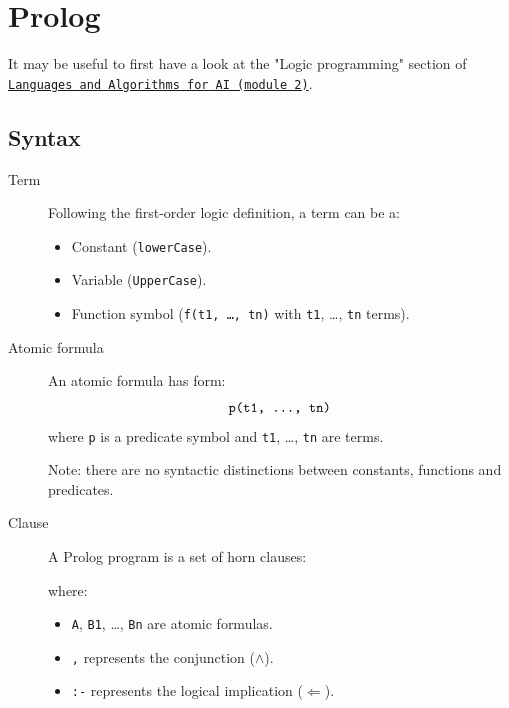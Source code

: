 \chapter{Prolog}


It may be useful to first have a look at the "Logic programming" section of 
\href{\gitLAAITwo}{\texttt{Languages and Algorithms for AI (module 2)}}.


\section{Syntax}

\begin{description}
    \item[Term] 
        Following the first-order logic definition, a term can be a:
        \begin{itemize}
            \item Constant (\texttt{lowerCase}).
            \item Variable (\texttt{UpperCase}).
            \item Function symbol (\texttt{f(t1, \dots, tn)} with \texttt{t1}, \dots, \texttt{tn} terms).
        \end{itemize}

    \item[Atomic formula] 
        An atomic formula has form:
        \[ \texttt{p(t1, \dots, tn)} \]
        where \texttt{p} is a predicate symbol and \texttt{t1}, \dots, \texttt{tn} are terms.

        Note: there are no syntactic distinctions between constants, functions and predicates.

    \item[Clause] 
        A Prolog program is a set of horn clauses:
        where:
        \begin{itemize}
            \item \texttt{A}, \texttt{B1}, \dots, \texttt{Bn} are atomic formulas.
            \item \texttt{,} represents the conjunction ($\land$).
            \item \texttt{:-} represents the logical implication ($\Leftarrow$).
        \end{itemize}


\end{description}
